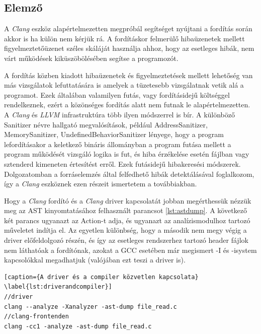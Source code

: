 \documentclass[a4paper,12pt]{report}
\begin{document}
\subsection*{Elemző}
A \emph{Clang} eszköz alapértelmezetten megpróbál segítséget nyújtani a fordítás során akkor is ha külön nem kérjük rá. A fordításkor felmerülő hibaüzenetek mellett figyelmeztetőüzenet széles skáláját használja ahhoz, hogy az esetleges hibák, nem várt működések kiküszöbölésében segítse a programozót.

A fordítás közben kiadott hibaüzenetek és figyelmeztetések mellett lehetőség van más vizsgálatok lefuttatására is amelyek a tüzetesebb vizsgálatnak vetik alá a programot. Ezek általában valamilyen futás, vagy fordításidejű költséggel rendelkeznek, ezért a közönséges fordítás alatt nem futnak le alapértelmezetten.
A \emph{Clang} és \emph{LLVM} infrastruktúra több ilyen módszerrel is bír. A különböző Sanitizer névre hallgató megvalósítások, például AddressSanitizer, MemorySanitizer, UndefinedBehaviorSanitizer lényege, hogy a program lefordításakor a keletkező bináris állományban a program futása mellett a program működését vizsgáló logika is fut, és hiba érzékelése esetén fájlban vagy sztenderd kimeneten értesítést erről. Ezek futásidejű hibakeresési módszerek. Dolgozatomban a forráselemzés által felfedhető hibák detektálásával foglalkozom, így a \emph{Clang} eszköznek ezen részeit ismertetem a továbbiakban.

Hogy a \emph{Clang} fordító és a \emph{Clang} driver kapcsolatát jobban megérthessük nézzük meg az AST kinyomtatásához felhasznált parancsot \ref{lst:astdump}. A következő két parancs ugyanazt az Action-t adja, és ugyanazt az analízismodulhoz tartozó műveletet indítja el. Az egyetlen különbség, hogy a második nem megy végig a driver előfeldolgozó részén, és így az esetleges rendszerhez tartozó header fájlok nem láthatóak a fordítónak, azokat a GCC esetében már megismert -I és -isystem kapcsolókkal megadhatjuk (valójában ezt teszi a driver is).

\begin{lstlisting}[caption={A driver és a compiler közvetlen kapcsolata}
\label{lst:driverandcompiler}]
//driver
clang --analyze -Xanalyzer -ast-dump file_read.c
//clang-frontenden
clang -cc1 -analyze -ast-dump file_read.c
\end{lstlisting}
\end{document}
